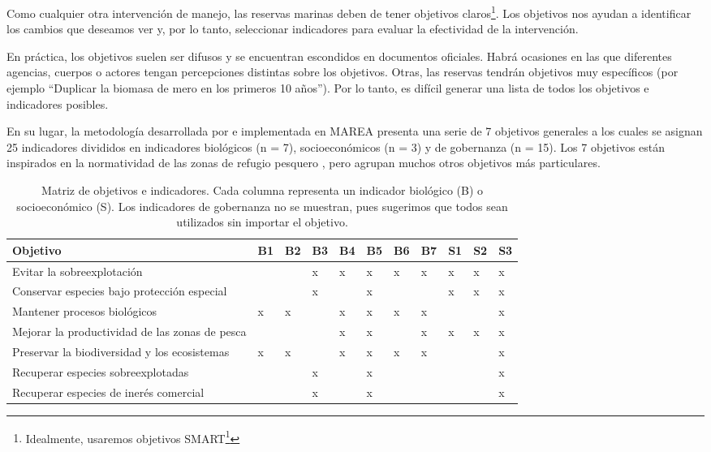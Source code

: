 \documentclass[]{krantz}
\renewcommand{\href}[2]{#2\footnote{\url{#1}}}
\begin{document}
Como cualquier otra intervención de manejo, las reservas marinas deben
de tener objetivos claros\footnote{Idealmente, usaremos objetivos
  \href{https://en.wikipedia.org/wiki/SMART_criteria}{SMART}}. Los
objetivos nos ayudan a identificar los cambios que deseamos ver y, por
lo tanto, seleccionar indicadores para evaluar la efectividad de la
intervención.

En práctica, los objetivos suelen ser difusos y se encuentran escondidos
en documentos oficiales. Habrá ocasiones en las que diferentes agencias,
cuerpos o actores tengan percepciones distintas sobre los objetivos.
Otras, las reservas tendrán objetivos muy específicos (por ejemplo
``Duplicar la biomasa de mero en los primeros 10 años''). Por lo tanto,
es difícil generar una lista de todos los objetivos e indicadores
posibles.

En su lugar, la metodología desarrollada por
\citet{villasenorderbez_2018} e implementada en MAREA presenta una serie
de 7 objetivos generales a los cuales se asignan 25 indicadores
divididos en indicadores biológicos (n = 7), socioeconómicos (n = 3) y
de gobernanza (n = 15). Los 7 objetivos están inspirados en la
normatividad de las zonas de refugio pesquero \citep{nom}, pero agrupan
muchos otros objetivos más particulares.

\begin{table}

\caption{\label{tab:tabla-oi}Matriz de objetivos e indicadores. Cada columna representa un indicador biológico (B) o socioeconómico (S). Los indicadores de gobernanza no se muestran, pues sugerimos que todos sean utilizados sin importar el objetivo.}
\centering
\begin{tabular}[t]{lllllllllll}
\toprule
Objetivo & B1 & B2 & B3 & B4 & B5 & B6 & B7 & S1 & S2 & S3\\
\midrule
Evitar la sobreexplotación &  &  & x & x & x & x & x & x & x & x\\
Conservar especies bajo protección especial &  &  & x &  & x &  &  & x & x & x\\
Mantener procesos biológicos & x & x &  & x & x & x & x &  &  & x\\
Mejorar la productividad de las zonas de pesca &  &  &  & x & x &  & x & x & x & x\\
Preservar la biodiversidad y los ecosistemas & x & x &  & x & x & x & x &  &  & x\\
\addlinespace
Recuperar especies sobreexplotadas &  &  & x &  & x &  &  &  &  & x\\
Recuperar especies de inerés comercial &  &  & x &  & x &  &  &  &  & x\\
\bottomrule
\end{tabular}
\end{table}
\end{document}

